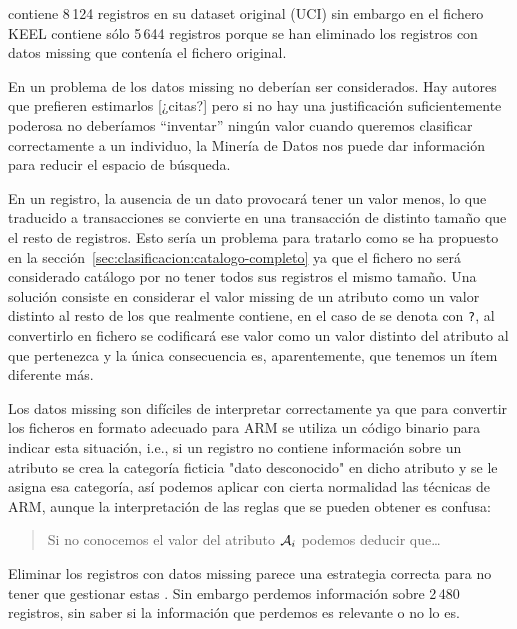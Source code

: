 \ABIERTO
\mushroom contiene 8\,124 registros en su dataset original (UCI) sin embargo en el fichero KEEL contiene sólo 5\,644 registros porque se han eliminado los registros con datos missing que contenía el fichero original.

En un problema de \clasificacion los datos missing no deberían ser considerados. Hay autores que prefieren estimarlos [¿citas?] pero si no hay una justificación suficientemente poderosa no deberíamos "`inventar"' ningún valor cuando queremos clasificar correctamente a un individuo, la Minería de Datos nos puede dar información para reducir el espacio de búsqueda.

En un registro, la ausencia de un dato provocará tener un valor menos, lo que traducido a transacciones se convierte en una transacción de distinto tamaño que el resto de registros. Esto sería un problema para tratarlo como se ha propuesto en la sección~\ref{sec:clasificacion:catalogo-completo} ya que el fichero \D no será considerado catálogo por no tener todos sus registros el mismo tamaño. Una solución consiste en considerar el valor missing de un atributo como un valor distinto al resto de los que realmente contiene, en el caso de \mushroom se denota con \texttt{?}, al convertirlo en fichero \D se codificará ese valor como un valor distinto del atributo al que pertenezca y la única consecuencia es, aparentemente, que tenemos un ítem diferente más.

Los datos missing son difíciles de interpretar correctamente ya que para convertir los ficheros en formato adecuado para ARM se utiliza un código binario para indicar esta situación, i.e., si un registro no contiene información sobre un atributo se crea la categoría ficticia "dato desconocido" en dicho atributo y se le asigna esa categoría, así podemos aplicar con cierta normalidad las técnicas de ARM, aunque la interpretación de las reglas que se pueden obtener es confusa:

\begin{quote}
Si no conocemos el valor del atributo $\A_i$ podemos deducir que\ldots
\end{quote}

Eliminar los registros con datos missing parece una estrategia correcta para no tener que gestionar estas \ars. Sin embargo perdemos información sobre 2\,480 registros, sin saber si la información que perdemos es relevante o no lo es.


